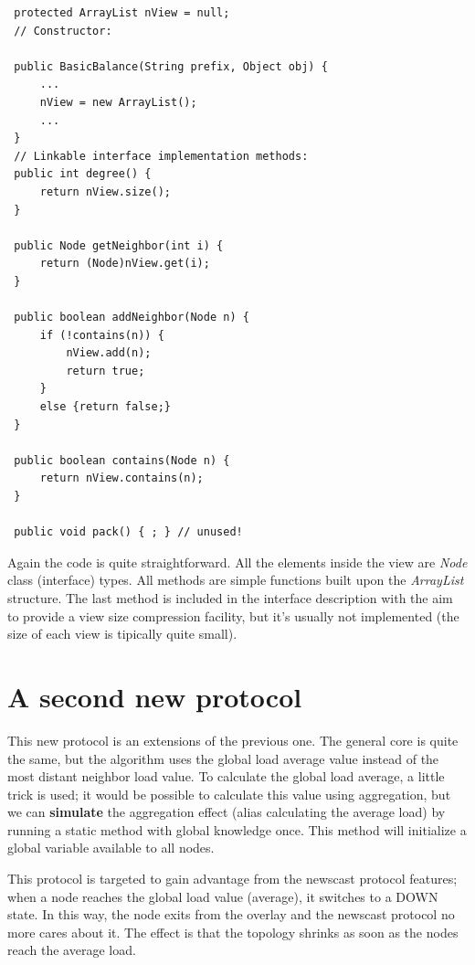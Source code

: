 \documentclass[a4paper,11pt]{article}
\begin{document}
\footnotesize
\begin{verbatim}
 protected ArrayList nView = null;
 // Constructor:
 
 public BasicBalance(String prefix, Object obj) {
     ...
     nView = new ArrayList();
     ...
 }
 // Linkable interface implementation methods:
 public int degree() {
     return nView.size();
 }
 
 public Node getNeighbor(int i) {
     return (Node)nView.get(i);
 } 
 
 public boolean addNeighbor(Node n) {
     if (!contains(n)) {
         nView.add(n);
         return true;
     }
     else {return false;}
 }
 
 public boolean contains(Node n) {
     return nView.contains(n);
 }
 
 public void pack() { ; } // unused!
\end{verbatim}
\normalsize

Again the code is quite straightforward. All the elements inside the
view are \emph{Node} class (interface) types. All methods are simple
functions built upon the \emph{ArrayList} structure. The last method
is included in the interface description with the aim to provide a
view size compression facility, but it's usually not implemented (the
size of each view is tipically quite small).


\section{A second new protocol}

This new protocol is an extensions of the previous one. The general
core is quite the same, but the algorithm uses the global load average
value instead of the most distant neighbor load value. To calculate
the global load average, a little trick is used; it would be possible
to calculate this value using aggregation, but we can \textbf{simulate}
the aggregation effect (alias calculating the average load) by running
a static method with global knowledge once. This method will initialize
a global variable available to all nodes. 

This protocol is targeted to gain advantage from the newscast protocol
features; when a node reaches the global load value (average), it
switches to a DOWN state. In this way, the node exits from the overlay
and the newscast protocol no more cares about it. The effect is that
the topology shrinks as soon as the nodes reach the average load.
\\
\end{document}
